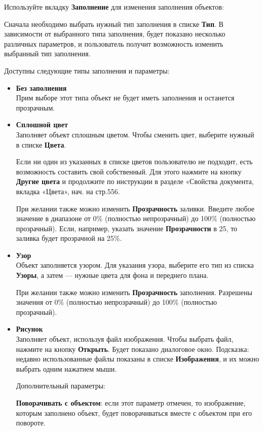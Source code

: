 \documentclass[a4paper,10pt]{article}
\begin{document}
 Используйте вкладку \textbf{Заполнение} для изменения заполнения объектов:
 
 Сначала необходимо выбрать нужный тип заполнения в списке \textbf{Тип}. В зависимости от выбранного типа заполнения, будет показано несколько различных параметров, и пользователь получит возможность изменить выбранный тип заполнения.
 
 Доступны следующие типы заполнения и параметры:
 \begin{itemize}
  \item \textbf{Без заполнения}\\
  Прим выборе этот типа объект не будет иметь заполнения и останется прозрачным.
  \item \textbf{Сплошной цвет}\\
  Заполняет объект сплошным цветом. Чтобы сменить цвет, выберите нужный в списке \textbf{Цвета}.
  
  Если ни один из указанных в списке цветов пользователю не подходит, есть возможность составить свой собственный. Для этого нажмите на кнопку \textbf{Другие цвета} и продолжите по инструкции в разделе «Свойства документа, вкладка «Цвета», нач. на стр.556.
  
  При желании также можно изменить \textbf{Прозрачность} заливки. Введите любое значение в диапазоне от 0\% (полностью непрозрачный) до 100\% (полностью прозрачный). Если, например, указать значение \textbf{Прозрачности} в 25, то заливка будет прозрачной на 25\%.
  \item \textbf{Узор}\\
  Объект заполняется узором. Для указания узора, выберите его тип из списка \textbf{Узоры}, а затем --- нужные цвета для фона и переднего плана.
  
  При желании также можно изменить \textbf{Прозрачность} заполнения. Разрешены значения от 0\% (полностью непрозрачный) до 100\% (полностью прозрачный).
  \item \textbf{Рисунок}\\
  Заполняет объект, используя файл изображения. Чтобы выбрать файл, нажмите на кнопку \textbf{Открыть}. Будет показано диалоговое окно. Подсказка: недавно использованные файлы показаны в списке \textbf{Изображения}, и их можно выбрать одним нажатием мыши.
  
  Дополнительный параметры:
  
  \textbf{Поворачивать с объектом}: если этот параметр отмечен, то изображение, которым заполнено объект, будет поворачиваться вместе с объектом при его повороте. 
  

\end{itemize}
\end{document}
